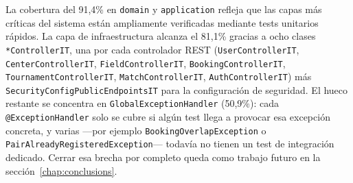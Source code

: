 \begin{table}[h]
\centering
{}
\caption{Resumen de tests y cobertura del backend (medida con JaCoCo, perfil \texttt{mvn clean verify}).}
\label{tab:resumen_tests}
\end{table}

La cobertura del 91,4\% en \texttt{domain} y \texttt{application} refleja que
las capas más críticas del sistema están ampliamente verificadas mediante
tests unitarios rápidos. La capa de infraestructura alcanza el 81,1\% gracias
a ocho clases \texttt{*ControllerIT}, una por cada controlador REST
(\texttt{UserControllerIT}, \texttt{CenterControllerIT},
\texttt{FieldControllerIT}, \texttt{BookingControllerIT},
\texttt{TournamentControllerIT}, \texttt{MatchControllerIT},
\texttt{AuthControllerIT}) más \texttt{SecurityConfigPublicEndpointsIT} para
la configuración de seguridad. El hueco restante se concentra en
\texttt{GlobalExceptionHandler} (50,9\%): cada \texttt{@ExceptionHandler}
solo se cubre si algún test llega a provocar esa excepción concreta, y varias
—por ejemplo \texttt{BookingOverlapException} o
\texttt{PairAlreadyRegisteredException}— todavía no tienen un test de
integración dedicado. Cerrar esa brecha por completo queda como trabajo
futuro en la sección~\ref{chap:conclusions}.
